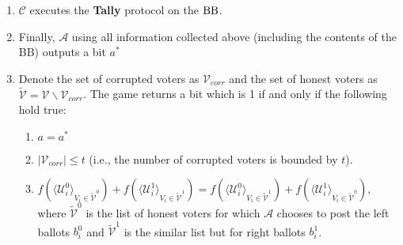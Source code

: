 \begin{definition}
\begin{enumerate}
\begin{enumerate}
\end{enumerate}
\item $\mathcal{C}$ executes the \textbf{Tally} protocol on the $\operatorname{BB}$. 
\item Finally, $\mathcal{A}$ using all information collected above (including the contents of the BB) outputs a bit $a^*$
\item Denote the set of corrupted voters as $\mathcal{V}_{corr}$ and the set of honest voters as $\tilde{\mathcal{V}}= \mathcal{V} \backslash \mathcal{V}_{corr}$. The game returns a bit which is 1 if and only if the following hold true:
\begin{enumerate}
 \item $a = a^*$
 \item $|\mathcal{V}_{corr}| \leq t$ (i.e., the number of corrupted voters is bounded by $t$).
 \item $f(\langle \mathcal{U}^0_i \rangle _{V_i \in \tilde{\mathcal{V}}^0} ) + f(\langle \mathcal{U}^1_i \rangle _{V_i \in \tilde{\mathcal{V}}^1} ) =  f(\langle \mathcal{U}^0_i \rangle _{V_i \in \tilde{\mathcal{V}}^1} ) +  f(\langle \mathcal{U}^1_i \rangle _{V_i \in \tilde{\mathcal{V}}^0} )$, where  $ \tilde{\mathcal{V}}^0$ is the list of honest voters for which $\mathcal{A}$ chooses to post the left ballots $b_i^0$  and $ \tilde{\mathcal{V}}^1$ is the similar list but for right ballots $b_i^1$. 
\end{enumerate}
\end{enumerate}
\end{definition}
 
